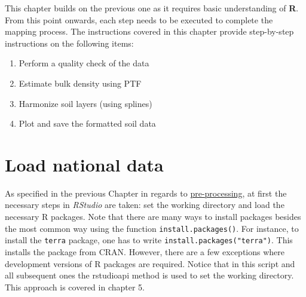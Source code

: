 \documentclass[
  10pt,
  b5paper,
  oneside]{book}
\newenvironment{Shaded}{\begin{snugshade}}{\end{snugshade}}
\newcommand{\CommentTok}[1]{\textcolor[rgb]{0.56,0.35,0.01}{\textit{#1}}}
\newcommand{\FunctionTok}[1]{\textcolor[rgb]{0.00,0.00,0.00}{#1}}
\newcommand{\NormalTok}[1]{#1}
\newcommand{\SpecialCharTok}[1]{\textcolor[rgb]{0.00,0.00,0.00}{#1}}
\newcommand{\StringTok}[1]{\textcolor[rgb]{0.31,0.60,0.02}{#1}}
\providecommand{\tightlist}{%
  \setlength{\itemsep}{0pt}\setlength{\parskip}{0pt}}
\begin{document}
This chapter builds on the previous one as it requires basic understanding of \textbf{R}. From this point onwards, each step needs to be executed to complete the mapping process. The instructions covered in this chapter provide step-by-step instructions on the following items:

\begin{enumerate}
\def\labelenumi{\arabic{enumi}.}
\tightlist
\item
  Perform a quality check of the data
\item
  Estimate bulk density using PTF
\item
  Harmonize soil layers (using splines)
\item
  Plot and save the formatted soil data
\end{enumerate}

\hypertarget{load-national-data}{%
\section{Load national data}\label{load-national-data}}

As specified in the previous Chapter in regards to \href{preproc}{pre-processing}, at first the necessary steps in \emph{RStudio} are taken: set the working directory and load the necessary R packages. Note that there are many ways to install packages besides the most common way using the function \texttt{install.packages()}. For instance, to install the \texttt{terra} package, one has to write \texttt{install.packages("terra")}. This installs the package from CRAN. However, there are a few exceptions where development versions of R packages are required. Notice that in this script and all subsequent ones the rstudioapi method is used to set the working directory. This approach is covered in chapter 5.

\begin{Shaded}
\end{Shaded}
\end{document}
